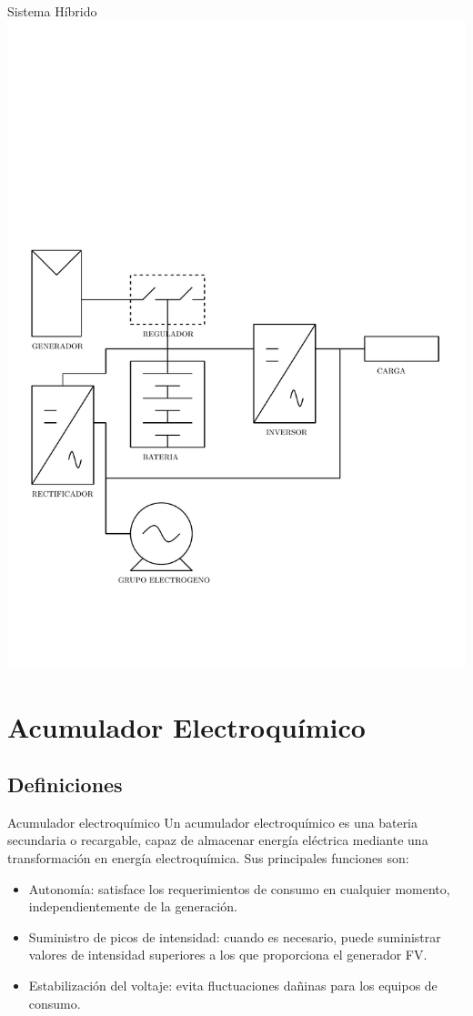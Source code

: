 \documentclass[xcolor={usenames,svgnames,dvipsnames}]{beamer}
\begin{document}
\begin{frame}[label=sec-1-0-5]{Sistema Híbrido}
\includegraphics[width=.9\linewidth]{../figs/DiagramaUnifilarER_Hibrido.pdf}
\end{frame}

\section{Acumulador Electroquímico}
\label{sec-2}

\subsection{Definiciones}
\label{sec-2-1}

\begin{frame}[label=sec-2-1-1]{Acumulador electroquímico}
Un acumulador electroquímico es una bateria secundaria o recargable, capaz de almacenar energía eléctrica mediante una transformación en energía electroquímica. Sus principales funciones son:

\begin{itemize}
\item \alert{Autonomía}: satisface los requerimientos de consumo en cualquier momento, independientemente de la generación.

\item \alert{Suministro de picos de intensidad}: cuando es necesario, puede suministrar valores de intensidad superiores a los que proporciona el generador FV.

\item \alert{Estabilización del voltaje}: evita fluctuaciones dañinas para los equipos de consumo.
\end{itemize}
\end{frame}
\end{document}
